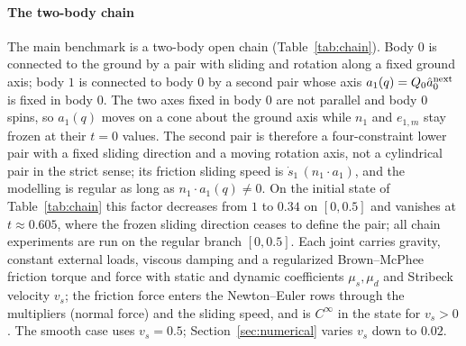 \paragraph{The two-body chain}
The main benchmark is a two-body open chain (Table~\ref{tab:chain}). Body $0$ is connected to the
ground by a pair with sliding and rotation along a fixed ground axis; body $1$ is connected to body
$0$ by a second pair whose axis $a_1(q)=Q_0\hat a^{\rm next}_0$ is fixed in body $0$. The two axes
fixed in body $0$ are not parallel and body $0$ spins, so $a_1(q)$ moves on a cone about the ground
axis while $n_1$ and $e_{1,m}$ stay frozen at their $t=0$ values. The second pair is therefore a
four-constraint lower pair with a fixed sliding direction and a moving rotation axis, not a
cylindrical pair in the strict sense; its friction sliding speed is $\dot s_1\,(n_1\cdot a_1)$, and
the modelling is regular as long as $n_1\cdot a_1(q)\neq0$. On the initial state of
Table~\ref{tab:chain} this factor decreases from $1$ to $0.34$ on $[0,0.5]$ and vanishes at
$t\approx0.605$, where the frozen sliding direction ceases to define the pair; all chain
experiments are run on the regular branch $[0,0.5]$. Each joint carries gravity, constant external
loads, viscous damping and a regularized Brown--McPhee friction torque and force
\cite{browmcphee2016friction} with static and dynamic coefficients $\mu_s,\mu_d$ and Stribeck
velocity $v_s$; the friction force enters the Newton--Euler rows through the multipliers (normal
force) and the sliding speed, and is $C^\infty$ in the state for $v_s>0$. The smooth case uses
$v_s=0.5$; Section~\ref{sec:numerical} varies $v_s$ down to $0.02$.

